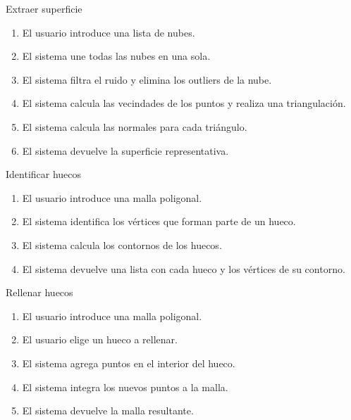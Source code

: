 \begin{CasoDeUso}{Extraer superficie}
	\CUNormal
	\begin{enumerate}
		\item El usuario introduce una lista de nubes.
		\item El sistema une todas las nubes en una sola.
		\item El sistema filtra el ruido y elimina los outliers de la nube.
		\item El sistema calcula las vecindades de los puntos y realiza una triangulación.
		\item El sistema calcula las normales para cada triángulo.
		\item El sistema devuelve la superficie representativa.
	\end{enumerate}
\end{CasoDeUso}

\begin{CasoDeUso}{Identificar huecos}
	\CUNormal
	\begin{enumerate}
		\item El usuario introduce una malla poligonal.
		\item El sistema identifica los vértices que forman parte de un hueco.
		\item El sistema calcula los contornos de los huecos.
		\item El sistema devuelve una lista con cada hueco y los vértices de su contorno.
	\end{enumerate}
\end{CasoDeUso}

\begin{CasoDeUso}{Rellenar huecos}
	\CUNormal
	\begin{enumerate}
		\item El usuario introduce una malla poligonal.
		\item El usuario elige un hueco a rellenar. 
		\item El sistema agrega puntos en el interior del hueco.
		\item El sistema integra los nuevos puntos a la malla.
		\item El sistema devuelve la malla resultante.
	\end{enumerate}
\end{CasoDeUso}
